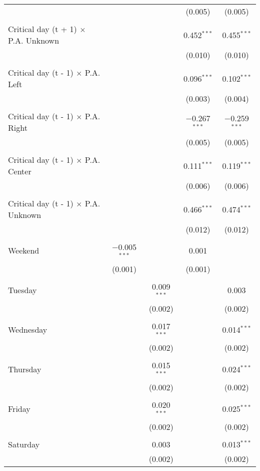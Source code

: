 \documentclass[
]{article}
\begin{document}
\begin{table}[!htbp]
{\begin{tabular}{@{\extracolsep{5pt}}lcccc}
  &  &  & (0.005) & (0.005) \\ 
  & & & & \\ 
 Critical day (t + 1) $\times$ P.A. Unknown &  &  & 0.452$^{***}$ & 0.455$^{***}$ \\ 
  &  &  & (0.010) & (0.010) \\ 
  & & & & \\ 
 Critical day (t - 1) $\times$ P.A. Left &  &  & 0.096$^{***}$ & 0.102$^{***}$ \\ 
  &  &  & (0.003) & (0.004) \\ 
  & & & & \\ 
 Critical day (t - 1) $\times$ P.A. Right &  &  & $-$0.267$^{***}$ & $-$0.259$^{***}$ \\ 
  &  &  & (0.005) & (0.005) \\ 
  & & & & \\ 
 Critical day (t - 1) $\times$ P.A. Center &  &  & 0.111$^{***}$ & 0.119$^{***}$ \\ 
  &  &  & (0.006) & (0.006) \\ 
  & & & & \\ 
 Critical day (t - 1) $\times$ P.A. Unknown &  &  & 0.466$^{***}$ & 0.474$^{***}$ \\ 
  &  &  & (0.012) & (0.012) \\ 
  & & & & \\ 
 Weekend & $-$0.005$^{***}$ &  & 0.001 &  \\ 
  & (0.001) &  & (0.001) &  \\ 
  & & & & \\ 
 Tuesday &  & 0.009$^{***}$ &  & 0.003 \\ 
  &  & (0.002) &  & (0.002) \\ 
  & & & & \\ 
 Wednesday &  & 0.017$^{***}$ &  & 0.014$^{***}$ \\ 
  &  & (0.002) &  & (0.002) \\ 
  & & & & \\ 
 Thursday &  & 0.015$^{***}$ &  & 0.024$^{***}$ \\ 
  &  & (0.002) &  & (0.002) \\ 
  & & & & \\ 
 Friday &  & 0.020$^{***}$ &  & 0.025$^{***}$ \\ 
  &  & (0.002) &  & (0.002) \\ 
  & & & & \\ 
 Saturday &  & 0.003 &  & 0.013$^{***}$ \\ 
  &  & (0.002) &  & (0.002) \\ 

\end{tabular}}
\end{table}
\end{document}
